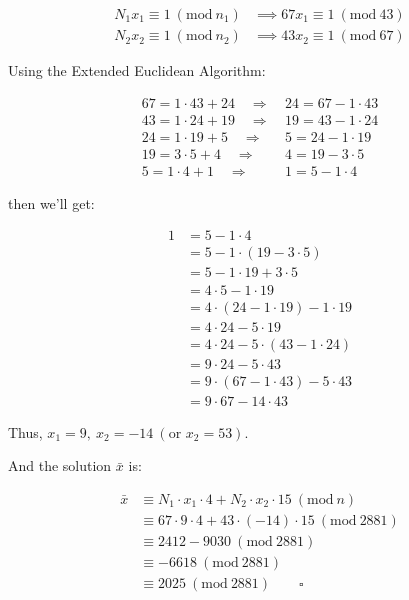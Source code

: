 \documentclass{article}
\newcommand{\modwos}[1]{\ (\mathrm{mod}\ #1)}
\begin{document}
\begin{align*}
    N_1 x_1 \equiv 1 \modwos{n_1} &\implies 67 x_1 \equiv 1 \modwos{43} \\
    N_2 x_2 \equiv 1 \modwos{n_2} &\implies 43 x_2 \equiv 1 \modwos{67}
\end{align*}

Using the Extended Euclidean Algorithm:

\begin{align*}
    67 = 1 \cdot 43 + 24 \quad \Rightarrow &\ 24 = 67 - 1 \cdot 43 \\
    43 = 1 \cdot 24 + 19 \quad \Rightarrow &\ 19 = 43 - 1 \cdot 24 \\
    24 = 1 \cdot 19 + 5 \quad \Rightarrow &\ 5 = 24 - 1 \cdot 19 \\
    19 = 3 \cdot 5 + 4 \quad \Rightarrow &\ 4 = 19 - 3 \cdot 5 \\
    5 = 1 \cdot 4 + 1 \quad \Rightarrow &\ 1 = 5 - 1 \cdot 4
\end{align*}

then we'll get:

\begin{align*}
    1 
    &= 5 - 1 \cdot 4 \\
    &= 5 - 1 \cdot (19 - 3 \cdot 5) \\
    &= 5 - 1 \cdot 19 + 3 \cdot 5 \\
    &= 4 \cdot 5 - 1 \cdot 19 \\
    &= 4 \cdot (24 - 1 \cdot 19) - 1 \cdot 19 \\
    &= 4 \cdot 24 - 5 \cdot 19 \\
    &= 4 \cdot 24 - 5 \cdot (43 - 1 \cdot 24) \\
    &= 9 \cdot 24 - 5 \cdot 43 \\
    &= 9 \cdot (67 - 1 \cdot 43) - 5 \cdot 43 \\
    &= 9 \cdot 67 - 14 \cdot 43
\end{align*}

Thus, $x_1 = 9, \ x_2 = -14 \ (\text{or } x_2 = 53)$.
\bigskip

And the solution $\bar{x}$ is:

\begin{align*}
    \bar{x}
    &\equiv N_1 \cdot x_1 \cdot 4 + N_2 \cdot x_2 \cdot 15 \modwos{n} \\
    &\equiv 67 \cdot 9 \cdot 4 + 43 \cdot (-14) \cdot 15 \modwos{2881} \\
    &\equiv 2412 - 9030 \modwos{2881} \\
    &\equiv -6618 \modwos{2881} \\
    &\equiv 2025 \modwos{2881} \qquad \square
\end{align*}
\end{document}
